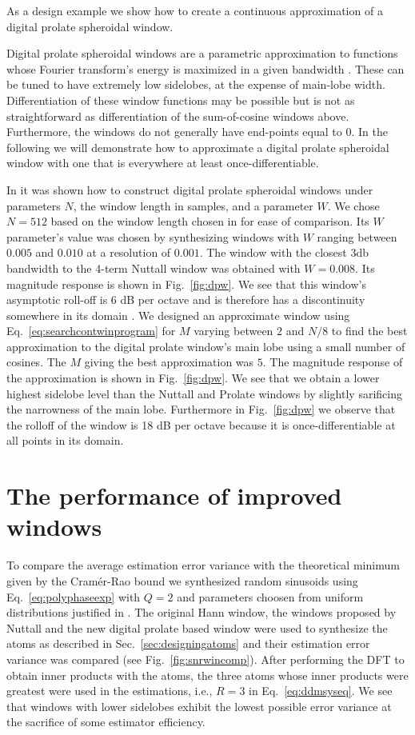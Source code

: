 \documentclass[twoside,a4paper]{article}
\begin{document}
As a design example we show how to create a continuous approximation of a digital
prolate spheroidal window.

Digital prolate spheroidal windows are a parametric approximation to functions
whose Fourier transform's energy is maximized in a given bandwidth
\cite{slepian1978prolate}. These can be tuned to have extremely low sidelobes,
at the expense of main-lobe width.  Differentiation of these window functions
may be possible but is not as straightforward as differentiation of the
sum-of-cosine windows above. Furthermore, the windows do not generally have
end-points equal to 0. In the following we will demonstrate how to approximate
a digital prolate spheroidal window with one that is everywhere at least
once-differentiable.

In \cite{verma1996digital} it was shown how to construct digital prolate
spheroidal windows under parameters $N$, the window length in samples, and a
parameter $W$. We chose $N=512$ based on the window length chosen in
\cite{betser2009sinusoidal} for ease of comparison. Its $W$ parameter's value
was chosen by synthesizing windows with $W$ ranging between $0.005$ and $0.010$
at a resolution of $0.001$. The window with the closest 3db bandwidth to the
4-term Nuttall window was obtained with $W=0.008$. Its magnitude response is
shown in Fig.~\ref{fig:dpw}. We see that
this window's asymptotic roll-off is 6 dB per octave and is therefore has a
discontinuity somewhere in its domain \cite{nuttall1981some}. We designed an approximate
window using Eq.~\ref{eq:searchcontwinprogram} for $M$ varying between $2$ and
$N/8$ to find the best approximation to the digital prolate window's main lobe
using a small number of cosines. The $M$ giving the best approximation was $5$.
The magnitude response of the approximation is shown in
Fig.~\ref{fig:dpw}.  We see that we obtain a lower highest sidelobe
level than the Nuttall and Prolate windows by slightly sarificing the narrowness
of the main lobe. Furthermore in Fig.~\ref{fig:dpw} we observe that
the rolloff of the window is 18 dB per octave because it is once-differentiable
at all points in its domain.

\section{The performance of improved windows}

To compare the average estimation error variance with the
theoretical minimum given by the Cram\'{e}r-Rao bound we synthesized random sinusoids using Eq.~\ref{eq:polyphaseexp}
with $Q=2$ and parameters choosen from uniform distributions justified in
\cite{betser2009sinusoidal}. The original Hann window,
the windows proposed by Nuttall and the new digital prolate based window were
used to synthesize the atoms as described in Sec.~\ref{sec:designingatoms} and
their estimation error variance was compared (see
Fig.~\ref{fig:snrwincomp}). After performing the DFT to obtain inner products
with the atoms, the three atoms whose inner products were greatest were used in
the estimations, i.e., $R=3$ in Eq.~\ref{eq:ddmsyseq}. We see that windows with
lower sidelobes exhibit the lowest possible error variance at the sacrifice of
some estimator efficiency.
\end{document}
